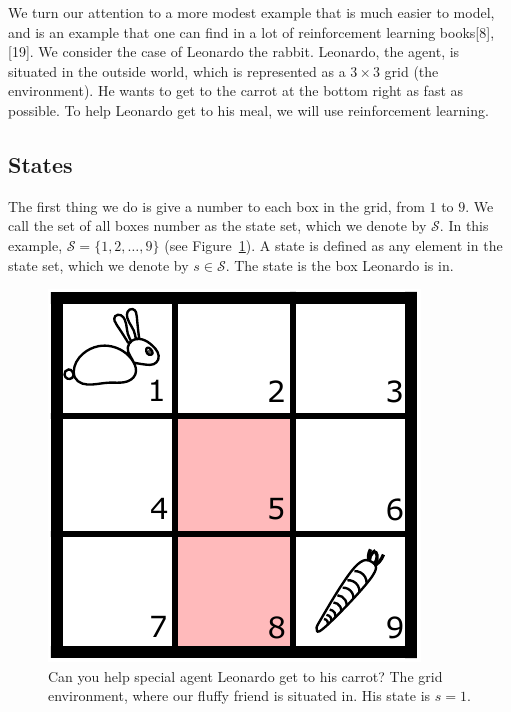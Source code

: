 \documentclass[
  letterpaper,
]{report}
\theoremstyle{plain}
\theoremstyle{definition}
\theoremstyle{definition}
\theoremstyle{remark}
\begin{document}
We turn our attention to a more modest example that is much easier to
model, and is an example that one can find in a lot of reinforcement
learning books{[}8{]}, {[}19{]}. We consider the case of Leonardo the
rabbit. Leonardo, the agent, is situated in the outside world, which is
represented as a \(3\times 3\) grid (the environment). He wants to get
to the carrot at the bottom right as fast as possible. To help Leonardo
get to his meal, we will use reinforcement learning.

\hypertarget{states}{%
\subsection{States}\label{states}}

The first thing we do is give a number to each box in the grid, from
\(1\) to \(9\). We call the set of all boxes number as the state set,
which we denote by \(\mathcal{S}\). In this example,
\(\mathcal{S} = \{1,2,\dots,9\}\) (see Figure~\ref{fig-gridworld1}). A
state is defined as any element in the state set, which we denote by
\(s\in\mathcal{S}\). The state is the box Leonardo is in.

\begin{figure}

{\centering \includegraphics{./images/gridworld.pdf}

}

\caption{\label{fig-gridworld1}Can you help special agent Leonardo get
to his carrot? The grid environment, where our fluffy friend is situated
in. His state is \(s=1\).}

\end{figure}
\end{document}
